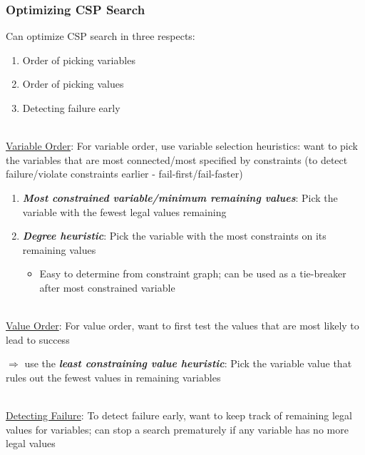 \documentclass[12pt]{extarticle}
\theoremstyle{definition}
\theoremstyle{remark}
\newcommand{\pstart}[0]{\noindent}
\newcommand{\newp}[0]{~\\ \pstart}
\newcommand{\term}[1]{\noindent\textbf{\textit{#1}}}
\begin{document}
\subsubsection{Optimizing CSP Search}
Can optimize CSP search in three respects: \begin{enumerate}
    \item Order of picking variables
    \item Order of picking values
    \item Detecting failure early
\end{enumerate}

\newp
\ul{Variable Order}: For variable order, use variable selection heuristics: want to pick the variables that are most connected/most specified by constraints (to detect failure/violate constraints earlier - fail-first/fail-faster) \begin{enumerate}
    \item \term{Most constrained variable/minimum remaining values}: Pick the variable with the fewest legal values remaining
    \item \term{Degree heuristic}: Pick the variable with the most constraints on its remaining values \begin{itemize}
        \item Easy to determine from constraint graph; can be used as a tie-breaker after most constrained variable
    \end{itemize}
\end{enumerate}

\newp
\ul{Value Order}: For value order, want to first test the values that are most likely to lead to success

\vspace{4pt}\pstart
$\Rightarrow$ use the \term{least constraining value heuristic}: Pick the variable value that rules out the fewest values in remaining variables


\newp
\ul{Detecting Failure}: To detect failure early, want to keep track of remaining legal values for variables; can stop a search prematurely if any variable has no more legal values
\end{document}
